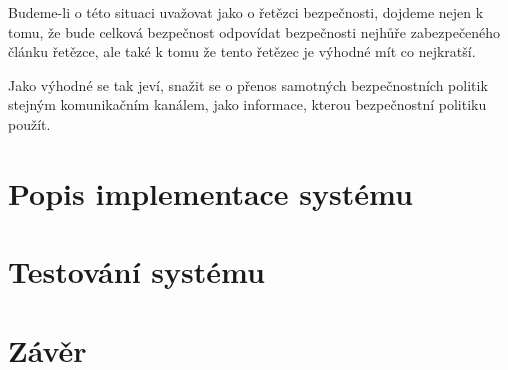Budeme-li o této situaci uvažovat jako o řetězci bezpečnosti, dojdeme nejen k tomu, že bude celková bezpečnost odpovídat bezpečnosti nejhůře zabezpečeného článku řetězce, ale také k tomu že tento řetězec je výhodné mít co nejkratší.

Jako výhodné se tak jeví, snažit se o přenos samotných bezpečnostních politik stejným komunikačním kanálem, jako informace, kterou bezpečnostní politiku použít.








\chapter{Popis implementace systému}


\chapter{Testování systému}


\chapter{Závěr}





